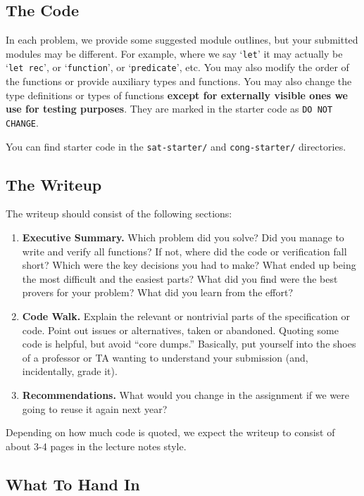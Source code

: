 \documentclass[11pt]{article}
\begin{document}
\clearpage
\subsection*{The Code}

In each problem, we provide some suggested module outlines, but your
submitted modules may be different.  For example, where we say
`\verb|let|' it may actually be `\verb|let rec|', or `\verb|function|',
or `\verb|predicate|', etc.  You may also modify the order of the
functions or provide auxiliary types and functions.  You may also change
the type definitions or types of functions \textbf{except for externally
  visible ones we use for testing purposes}.  They are marked in the
starter code as \verb|DO NOT CHANGE|.

You can find starter code in the \verb|sat-starter/| and \verb|cong-starter/|
directories.

\subsection*{The Writeup}

The writeup should consist of the following sections:
\begin{enumerate}
\item {\bf{Executive Summary.}}  Which problem did you solve?  Did you manage
  to write and verify all functions?  If not, where did the code or
  verification fall short?  Which were the key decisions you had to
  make?  What ended up being the most difficult and the easiest parts?
  What did you find were the best provers for your problem?  What did
  you learn from the effort?
\item {\bf{Code Walk.}}  Explain the relevant or nontrivial parts of the
  specification or code.  Point out issues or alternatives, taken or
  abandoned.  Quoting some code is helpful, but avoid ``core dumps.''
  Basically, put yourself into the shoes of a professor or TA wanting
  to understand your submission (and, incidentally, grade it).
\item {\bf{Recommendations.}}  What would you change in the assignment if we
  were going to reuse it again next year?
\end{enumerate}
Depending on how much code is quoted, we expect the writeup to consist of about
3-4 pages in the lecture notes style.

\subsection*{What To Hand In}
\end{document}
